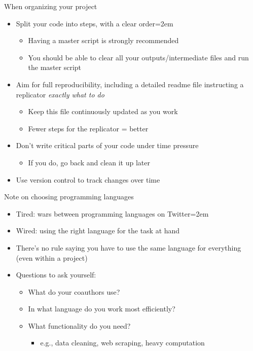 \documentclass[handout]{beamer}
\begin{document}
\begin{frame}{When organizing your project}
    \begin{itemize}
        \item Split your code into steps, with a clear order\itemsep=2em
        \begin{itemize}
            \item Having a master script is strongly recommended
            \item You should be able to clear all your outputs/intermediate files and run the master script
        \end{itemize}
        \item<2-> Aim for full reproducibility, including a detailed readme file instructing a replicator \textit{exactly what to do}
        \begin{itemize}
            \item Keep this file continuously updated as you work
            \item Fewer steps for the replicator = better
        \end{itemize}
        \item<3-> Don't write critical parts of your code under time pressure
        \begin{itemize}
            \item If you do, go back and clean it up later
        \end{itemize}
        \item<4-> Use version control to track changes over time
    \end{itemize}
\end{frame}

\begin{frame}{Note on choosing programming languages}
    \begin{itemize}
        \item Tired: wars between programming languages on Twitter\itemsep=2em
        \item Wired: using the right language for the task at hand
        \item There's no rule saying you have to use the same language for everything (even within a project)
        \item<2-> Questions to ask yourself:
        \begin{itemize}
            \item What do your coauthors use?
            \item In what language do you work most efficiently?
            \item What functionality do you need?
            \begin{itemize}
                \item e.g., data cleaning, web scraping, heavy computation
            \end{itemize}
        \end{itemize}
    \end{itemize}
\end{frame}
\end{document}
